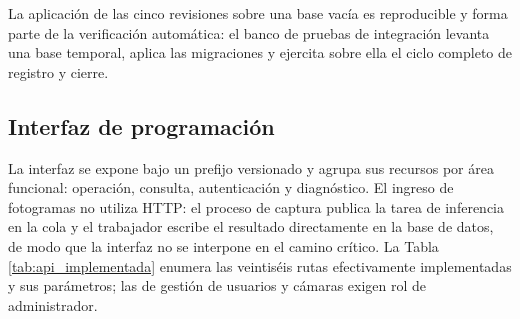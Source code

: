 La aplicación de las cinco revisiones sobre una base vacía es reproducible y forma
parte de la verificación automática: el banco de pruebas de integración levanta
una base temporal, aplica las migraciones y ejercita sobre ella el ciclo completo
de registro y cierre.

\subsection{Interfaz de programación}

La interfaz se expone bajo un prefijo versionado y agrupa sus recursos por área
funcional: operación, consulta, autenticación y diagnóstico. El ingreso de
fotogramas no utiliza HTTP: el proceso de captura publica la tarea de inferencia
en la cola y el trabajador escribe el resultado directamente en la base de datos,
de modo que la interfaz no se interpone en el camino crítico. La Tabla
\ref{tab:api_implementada} enumera las veintiséis rutas efectivamente
implementadas y sus parámetros; las de gestión de usuarios y cámaras exigen rol
de administrador.

